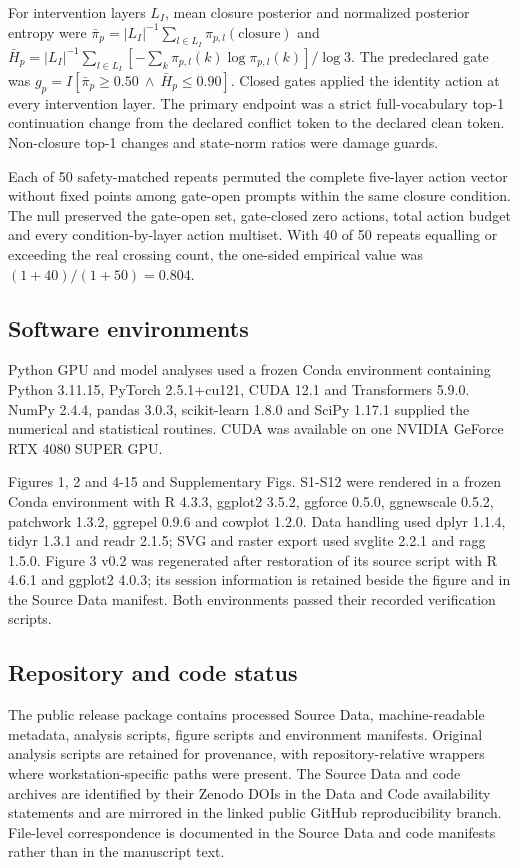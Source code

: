 \documentclass[11pt]{article}
\begin{document}
For intervention layers $L_I$, mean closure posterior and normalized posterior entropy were $\bar\pi_p=|L_I|^{-1}\sum_{l\in L_I}\pi_{p,l}(\mathrm{closure})$ and $\bar H_p=|L_I|^{-1}\sum_{l\in L_I}[-\sum_k\pi_{p,l}(k)\log\pi_{p,l}(k)]/\log 3$. The predeclared gate was $g_p=I[\bar\pi_p\geq0.50\ \land\ \bar H_p\leq0.90]$. Closed gates applied the identity action at every intervention layer. The primary endpoint was a strict full-vocabulary top-1 continuation change from the declared conflict token to the declared clean token. Non-closure top-1 changes and state-norm ratios were damage guards.

Each of 50 safety-matched repeats permuted the complete five-layer action vector without fixed points among gate-open prompts within the same closure condition. The null preserved the gate-open set, gate-closed zero actions, total action budget and every condition-by-layer action multiset. With 40 of 50 repeats equalling or exceeding the real crossing count, the one-sided empirical value was $(1+40)/(1+50)=0.804$.

\subsection*{Software environments}
Python GPU and model analyses used a frozen Conda environment containing Python 3.11.15, PyTorch 2.5.1+cu121, CUDA 12.1 and Transformers 5.9.0. NumPy 2.4.4, pandas 3.0.3, scikit-learn 1.8.0 and SciPy 1.17.1 supplied the numerical and statistical routines. CUDA was available on one NVIDIA GeForce RTX 4080 SUPER GPU.

Figures 1, 2 and 4-15 and Supplementary Figs. S1-S12 were rendered in a frozen Conda environment with R 4.3.3, ggplot2 3.5.2, ggforce 0.5.0, ggnewscale 0.5.2, patchwork 1.3.2, ggrepel 0.9.6 and cowplot 1.2.0. Data handling used dplyr 1.1.4, tidyr 1.3.1 and readr 2.1.5; SVG and raster export used svglite 2.2.1 and ragg 1.5.0. Figure 3 v0.2 was regenerated after restoration of its source script with R 4.6.1 and ggplot2 4.0.3; its session information is retained beside the figure and in the Source Data manifest. Both environments passed their recorded verification scripts.

\subsection*{Repository and code status}
The public release package contains processed Source Data, machine-readable metadata, analysis scripts, figure scripts and environment manifests. Original analysis scripts are retained for provenance, with repository-relative wrappers where workstation-specific paths were present. The Source Data and code archives are identified by their Zenodo DOIs in the Data and Code availability statements and are mirrored in the linked public GitHub reproducibility branch. File-level correspondence is documented in the Source Data and code manifests rather than in the manuscript text.
\end{document}
